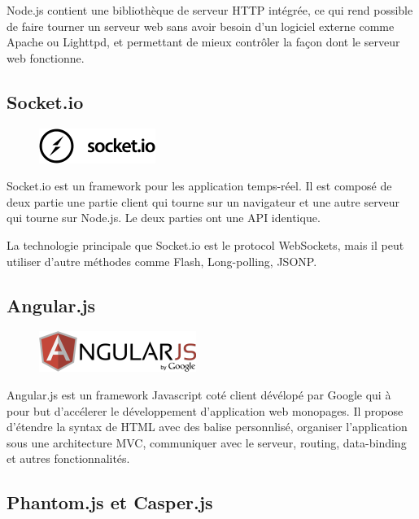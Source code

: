 \documentclass[a4paper]{article}
\begin{document}
Node.js contient une bibliothèque de 
serveur HTTP intégrée, ce qui rend possible de faire tourner un serveur 
web sans avoir besoin d'un logiciel externe comme Apache ou Lighttpd, 
et permettant de mieux contrôler la façon dont le serveur web fonctionne.

\subsection{Socket.io}

\begin{figure}[H]
  \begin{center}
  \includegraphics[scale=1]{socketio.png}
  \end{center}
\end{figure}

Socket.io est un framework pour les application temps-réel. Il est composé de deux 
partie une partie client qui tourne sur un navigateur et une autre serveur qui tourne sur Node.js.
Le deux parties ont une API identique.

La technologie principale que Socket.io est le protocol WebSockets, mais il
peut utiliser d'autre méthodes comme Flash, Long-polling, JSONP.

\subsection{Angular.js}

\begin{figure}[H]
  \begin{center}
  \includegraphics[scale=1]{angularjs.png}
  \end{center}
\end{figure}

Angular.js est un framework Javascript coté client dévélopé par Google
qui à pour but d'accélerer le développement d'application web monopages.
Il propose d'étendre la syntax de HTML avec des balise personnlisé, organiser 
l'application sous une architecture MVC, communiquer avec le serveur, routing, 
data-binding et autres fonctionnalités.

\subsection{Phantom.js et Casper.js}
\end{document}
